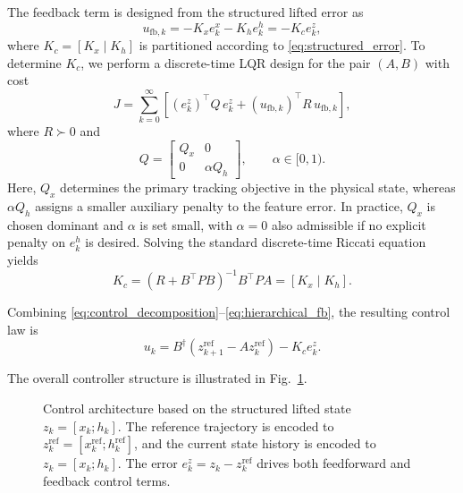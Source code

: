 The feedback term is designed from the structured lifted error as
\begin{equation}
    u_{\mathrm{fb},k}
    =
    -K_x e_k^x - K_h e_k^h
    =
    -K_c e_k^z,
    \label{eq:hierarchical_fb}
\end{equation}
where $K_c = [K_x\;|\;K_h]$ is partitioned according to \eqref{eq:structured_error}. To determine $K_c$, we perform a discrete-time LQR design for the pair $(A,B)$ with cost
\begin{equation}
    J = \sum_{k=0}^{\infty}
    \left[
        (e_k^z)^\top Q\,e_k^z
        +
        (u_{\mathrm{fb},k})^\top R\,u_{\mathrm{fb},k}
    \right],
    \label{eq:lqr_objective}
\end{equation}
where $R \succ 0$ and
\begin{equation}
    Q =
    \begin{bmatrix}
        Q_x & 0 \\
        0 & \alpha Q_h
    \end{bmatrix},
    \qquad \alpha \in [0,1).
    \label{eq:block_diag_Q}
\end{equation}
Here, $Q_x$ determines the primary tracking objective in the physical state, whereas $\alpha Q_h$ assigns a smaller auxiliary penalty to the feature error. In practice, $Q_x$ is chosen dominant and $\alpha$ is set small, with $\alpha = 0$ also admissible if no explicit penalty on $e_k^h$ is desired. Solving the standard discrete-time Riccati equation yields
\begin{equation}
    K_c
    =
    (R + B^\top P B)^{-1} B^\top P A
    =
    [K_x\;|\;K_h].
    \label{eq:lqr_gain}
\end{equation}

Combining \eqref{eq:control_decomposition}--\eqref{eq:hierarchical_fb}, the resulting control law is
\begin{equation}
    u_k
    =
    B^\dagger \!\left(z_{k+1}^{\mathrm{ref}} - A z_k^{\mathrm{ref}}\right)
    - K_c e_k^z.
    \label{eq:full_ctrl}
\end{equation}

The overall controller structure is illustrated in Fig.~\ref{fig:control_architecture}.

\begin{figure}[!t]
    \centering
    \caption{Control architecture based on the structured lifted state $z_k=[x_k;h_k]$. The reference trajectory is encoded to $z_k^{\mathrm{ref}}=[x_k^{\mathrm{ref}};h_k^{\mathrm{ref}}]$, and the current state history is encoded to $z_k=[x_k;h_k]$. The error $e_k^z = z_k - z_k^{\mathrm{ref}}$ drives both feedforward and feedback control terms.}
    \label{fig:control_architecture}
\end{figure}

